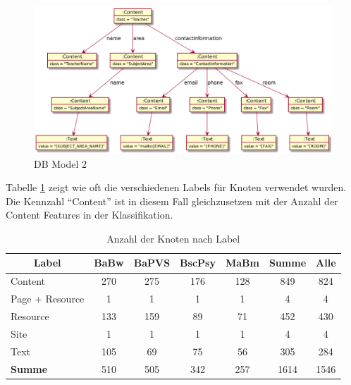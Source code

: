     \begin{figure}[htb]
        \centering
        \includegraphics[scale=\imageScalingFactor]{../resources/findings/case-study-1/dbmodel/dbmodel2.png}
        \caption{DB Model 2}
        \label{image:findingTeachersFiguresDbModel2}
    \end{figure}

    Tabelle \ref{table:findingsTeachersFiguresNodesByLabel}
    zeigt wie oft die verschiedenen Labels für Knoten verwendet wurden.
    Die Kennzahl "`Content"' ist in diesem Fall gleichzusetzen mit
    der Anzahl der Content Features in der Klassifikation.

    \begin{table}[htb]
        \centering
        \begin{tabular}{|l|c|c|c|c|c|c|}
            \hline
            \multicolumn{1}{|c|}{\textbf{Label}} & \textbf{BaBw} & \textbf{BaPVS} & \textbf{BscPsy} & \textbf{MaBm} & \textbf{Summe} & \textbf{Alle} \\ \hline
            Content                                     & 270           & 275            & 176             & 128           & 849            & 824           \\ \hline
            Page + Resource                             & 1             & 1              & 1               & 1             & 4              & 4             \\ \hline
            Resource                                    & 133           & 159            & 89              & 71            & 452            & 430           \\ \hline
            Site                                        & 1             & 1              & 1               & 1             & 4              & 4             \\ \hline
            Text                                        & 105           & 69             & 75              & 56            & 305            & 284           \\ \hline
            \hline
            \textbf{Summe}                              & 510           & 505            & 342             & 257           & 1614           & 1546          \\ \hline
        \end{tabular}
        \caption{Anzahl der Knoten nach Label}
        \label{table:findingsTeachersFiguresNodesByLabel}
    \end{table}

